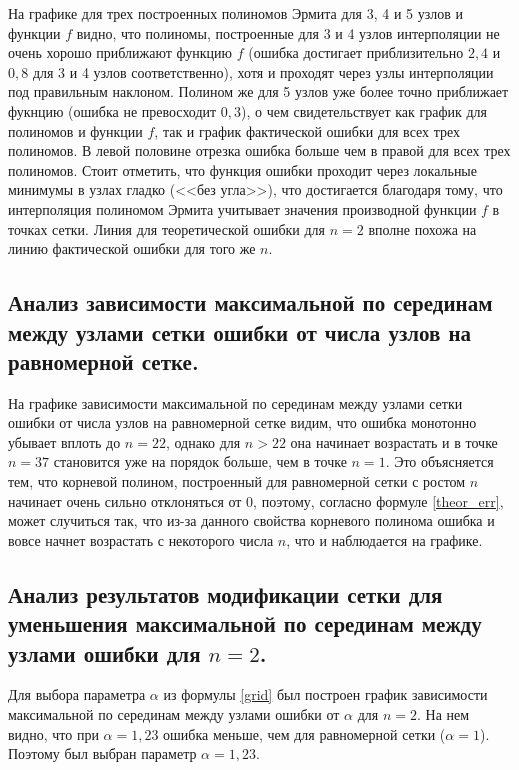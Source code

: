 \documentclass[a4paper, 12pt]{article}
\begin{document}
	На графике для трех построенных полиномов Эрмита для 3, 4 и 5 узлов и функции $f$ видно, что полиномы, построенные для 3 и 4 узлов интерполяции не очень хорошо приближают функцию $f$ (ошибка достигает приблизительно $2,4$ и $0,8$ для 3 и 4 узлов соответственно), хотя и проходят через узлы интерполяции под правильным наклоном. Полином же для 5 узлов уже более точно приближает фукнцию (ошибка не превосходит $0,3$), о чем свидетельствует как график для полиномов и функции $f$, так и график фактической ошибки для всех трех полиномов. В левой половине отрезка ошибка больше чем в правой для всех трех полиномов. Стоит отметить, что функция ошибки проходит через локальные минимумы в узлах гладко (<<без угла>>), что достигается благодаря тому, что интерполяция полиномом Эрмита учитывает значения производной функции $f$ в точках сетки. Линия для теоретической ошибки для $n=2$ вполне похожа на линию фактической ошибки для того же $n$.
	
	\subsection{Анализ зависимости максимальной по серединам между узлами сетки ошибки от числа узлов на равномерной сетке.}
	
	На графике зависимости максимальной по серединам между узлами сетки ошибки от числа узлов на равномерной сетке видим, что ошибка монотонно убывает вплоть до $n=22$, однако для $n>22$ она начинает возрастать и в точке $n=37$ становится уже на порядок больше, чем в точке $n=1$. Это объясняется тем, что корневой полином, построенный для равномерной сетки с ростом $n$ начинает очень сильно отклоняться от 0, поэтому, согласно формуле \eqref{theor_err}, может случиться так, что из-за данного свойства корневого полинома ошибка и вовсе начнет возрастать с некоторого числа $n$, что и наблюдается на графике.
	
	\subsection{Анализ результатов модификации сетки для уменьшения максимальной по серединам между узлами ошибки для $n=2$.}
	
	Для выбора параметра $\alpha$ из формулы \eqref{grid} был построен график зависимости максимальной по серединам между узлами ошибки от $\alpha$ для $n=2$. На нем видно, что при $\alpha=1,23$ ошибка меньше, чем для равномерной сетки ($\alpha=1$). Поэтому был выбран параметр $\alpha=1,23$.
	
\end{document}
